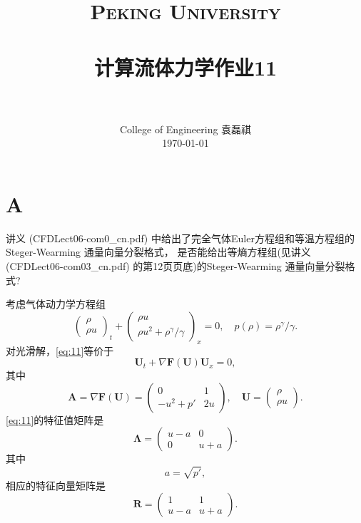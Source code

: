 \documentclass[12pt]{article}
\title{
		\vspace{-1in} 	
		\usefont{OT1}{bch}{b}{n}
		\normalfont \normalsize \textsc{\LARGE Peking University}\\[0.2cm] %
		\horrule{0.5pt} \\[0.2cm]
		\huge \bfseries{计算流体力学作业11} \\[-0.2cm]
		\horrule{2pt} \\[0.2cm]
}
\author{
		\normalfont 								\normalsize
		College of Engineering \quad 2001111690  \quad 袁磊祺\\	\normalsize
        \today
}
\date{}
\begin{document}


\maketitle

\section{A}

讲义 (CFDLect06-com0_cn.pdf) 中给出了完全气体Euler方程组和等温方程组的Steger-Wearming 通量向量分裂格式， 是否能给出等熵方程组(见讲义 (CFDLect06-com03_cn.pdf) 的第12页页底)的Steger-Wearming 通量向量分裂格式?

考虑气体动力学方程组
\begin{equation}
	\begin{pmatrix}
		\rho \\
		\rho u
	\end{pmatrix}_t
	+\begin{pmatrix}
		\rho u \\
		\rho u^2+\rho^\gamma/\gamma
	\end{pmatrix}_x = 0,\quad p(\rho) = \rho^\gamma/\gamma.
	\label{eq:11}
\end{equation}
对光滑解，\cref{eq:11}等价于
\begin{equation}
	\bm{U}_t + \nabla \bm{F}(\bm{U})\bm{U}_x=0,
\end{equation}
其中
\begin{equation}
	\bm{A} = \nabla \bm{F}(\bm{U}) = \begin{pmatrix}
		0       & 1  \\
		-u^2+p' & 2u
	\end{pmatrix},\quad \bm{U}=\begin{pmatrix}
		\rho \\
		\rho u
	\end{pmatrix}.
\end{equation}
\cref{eq:11}的特征值矩阵是
\begin{equation}
	\bm{\Lambda} =
	\begin{pmatrix}
		u - a & 0   \\
		0     & u+a
	\end{pmatrix}.
\end{equation}
其中
\begin{equation}
	a=\sqrt{p'},
\end{equation}
相应的特征向量矩阵是
\begin{equation}
	\bm{R} =
	\begin{pmatrix}
		1   & 1   \\
		u-a & u+a
	\end{pmatrix}.
\end{equation}
\end{document}
